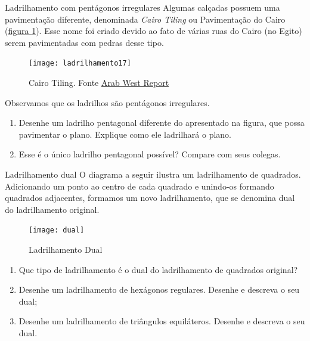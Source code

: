 \begin{task}{Ladrilhamento com pentágonos irregulares}
Algumas calçadas possuem uma pavimentação diferente, denominada \textit{Cairo Tiling} ou Pavimentação do Cairo (\hyperref[cairo]{figura \ref{cairo}}). Esse nome foi criado devido ao fato de várias ruas do Cairo (no Egito) serem pavimentadas com pedras desse tipo.

	\begin{figure}[H]
	\centering
	\texttt{[image: ladrilhamento17]}
	\caption{Cairo Tiling. Fonte \href{encurtador.com.br/eksyU}{Arab West Report}}
	\label{cairo}
	\end{figure}

Observamos que os ladrilhos são pentágonos irregulares.

	\begin{enumerate}
		\item Desenhe um ladrilho pentagonal diferente do apresentado na figura, que possa pavimentar o plano. Explique como ele ladrilhará o plano.
		\item Esse é o único ladrilho pentagonal possível? Compare com seus colegas.
	\end{enumerate}

\end{task}

\clearpage

\begin{task}{Ladrilhamento dual}
O diagrama a seguir ilustra um ladrilhamento de quadrados. Adicionando um ponto ao centro de cada quadrado e unindo-os formando quadrados adjacentes, formamos um novo ladrilhamento, que se denomina dual do ladrilhamento original.

	\begin{figure}[H]
	\centering
	\texttt{[image: dual]}
	\caption{Ladrilhamento Dual}
	\end{figure}

	\begin{enumerate}
		\item Que tipo de ladrilhamento é o dual do ladrilhamento de quadrados original?
		\item Desenhe um ladrilhamento de hexágonos regulares. Desenhe e descreva o seu dual;
		\item Desenhe um ladrilhamento de triângulos equiláteros. Desenhe e descreva o seu dual.
	\end{enumerate}

\end{task}



